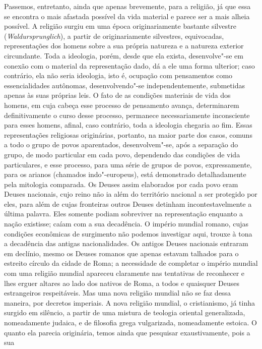 Passemos, entretanto, ainda que apenas brevemente, para a religião, já
que essa se encontra o mais afastada possível da vida material e parece
ser a mais alheia possível. A religião surgiu em uma época
originariamente bastante silvestre (\emph{Waldursprunglich}), a partir
de originariamente silvestres, equivocadas, representações dos homens
sobre a sua própria natureza e a natureza exterior circundante. Toda a
ideologia, porém, desde que ela exista, desenvolve"-se em conexão com o
material da representação dado, dá a ele uma forma ulterior; caso
contrário, ela não seria ideologia, isto é, ocupação com pensamentos
como essencialidades autônomas, desenvolvendo"-se independentemente,
submetidas apenas às suas próprias leis. O fato de as condições
materiais de vida dos homens, em cuja cabeça esse processo de pensamento
avança, determinarem definitivamente o curso desse processo, permanece
necessariamente inconsciente para esses homens, afinal, caso contrário,
toda a ideologia chegaria ao fim. Essas representações religiosas
originárias, portanto, na maior parte dos casos, comuns a todo o grupo
de povos aparentados, desenvolvem"-se, após a separação do grupo, de modo
particular em cada povo, dependendo das condições de vida particulares,
e esse processo, para uma série de grupos de povos, expressamente, para
os arianos (chamados indo"-europeus), está demonstrado detalhadamente
pela mitologia comparada. Os Deuses assim elaborados por cada povo eram
Deuses nacionais, cujo reino não ia além do território nacional a ser
protegido por eles, para além de cujas fronteiras outros Deuses detinham
incontestavelmente a última palavra. Eles somente podiam sobreviver na
representação enquanto a nação existisse; caíam com a sua decadência. O
império mundial romano, cujas condições econômicas de surgimento não
podemos investigar aqui, trouxe à tona a decadência das antigas
nacionalidades. Os antigos Deuses nacionais entraram em declínio, mesmo
os Deuses romanos que apenas estavam talhados para o estreito círculo da
cidade de Roma; a necessidade de completar o império mundial com uma
religião mundial apareceu claramente nas tentativas de reconhecer e lhes
erguer altares ao lado dos nativos de Roma, a todos e quaisquer Deuses
estrangeiros respeitáveis. Mas uma nova religião mundial não se faz
dessa maneira, por decretos imperiais. A nova religião mundial, o
cristianismo, já tinha surgido em silêncio, a partir de uma mistura de
teologia oriental generalizada, nomeadamente judaica, e de filosofia
grega vulgarizada, nomeadamente estoica. O quanto ela parecia
originária, temos ainda que pesquisar exaustivamente, pois a sua
